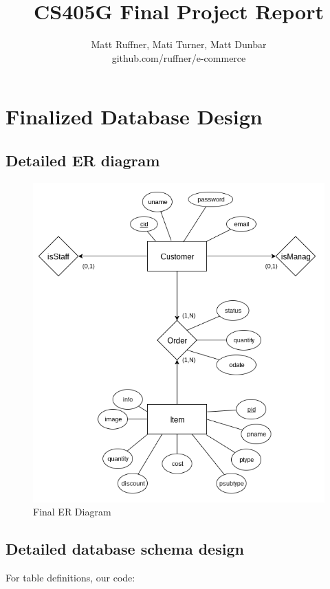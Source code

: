 \documentclass[letterpaper]{article}
\title{CS405G Final Project Report}
\author{Matt Ruffner, Mati Turner, Matt Dunbar\\ \small{github.com/ruffner/e-commerce}}
\begin{document}
\maketitle

\section{Finalized Database Design}

\subsection{Detailed ER diagram}
\begin{figure}[H]
\centering
\includegraphics[width=\textwidth]{final-er}
\caption{Final ER Diagram}
\label{er}
\end{figure}
\subsection{Detailed database schema design}
For table definitions, our code: 
\end{document}
